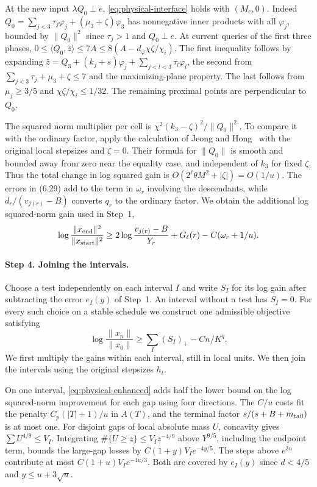 \documentclass[11pt]{article}
\theoremstyle{definition}
\begin{document}
At the new input $\lambda Q_0\perp e$, \eqref{eq:physical-interface} holds with $(M_c,0)$. Indeed $Q_0=\sum_{j<3}\tau_j\varphi_j+(\mu_3+\zeta)\varphi_3$ has nonnegative inner products with all $\varphi_j$, bounded by $\|Q_0\|^2$ since $\tau_j>1$ and $Q_0\perp e$. At current queries of the first three phases,
$0\le\langle Q_0,\widehat z\rangle\le7A\le8(A-d_\varphi\chi\zeta/\chi_i)$. The first inequality follows by expanding $\widehat z=Q_3+(k_j+s)\varphi_j+\sum_{j<l<3}\tau_l\varphi_l$, the second from $\sum_{j<3}\tau_j+\mu_3+\zeta\le7$ and the maximizing-plane property. The last follows from $\mu_j\ge3/5$ and $\chi\zeta/\chi_i\le1/32$. The remaining proximal points are perpendicular to $Q_0$.

The squared norm multiplier per cell is $\chi^2(k_3-\zeta)^2/\|Q_0\|^2$. To compare it with the ordinary factor, apply the calculation of Jeong and Hong~\cite[(6.20), (6.28)--(6.32)]{JH} with the original local stepsizes and $\zeta=0$. Their formula for $\|Q_0\|$ is smooth and bounded away from zero near the equality case, and independent of $k_3$ for fixed $\zeta$. Thus the total change in log squared gain is $O(2^\ell\theta M^2+|\zeta|)=O(1/u)$. The errors in (6.29) add to the term in $\omega_r$ involving the descendants, while $d_r/(v_{j(r)}-B)$ converts $q_r$ to the ordinary factor. We obtain the additional log squared-norm gain used in Step~1,
\begin{equation}\label{eq:physical-enhanced}
 \log\frac{\|x_{\rm end}\|^2}{\|x_{\rm start}\|^2}
 \ge 2\log\frac{v_{j(r)}-B}{Y_r}+G_\ell(r)-C(\omega_r+1/u).
\end{equation}

\paragraph{Step 4. Joining the intervals.}
Choose a test independently on each interval \(I\) and write \(S_I\)
for its log gain after subtracting the error \(e_I(y)\) of Step~1.
An interval without a test has \(S_I=0\). For every such choice on a
stable schedule we construct one admissible objective satisfying
\begin{equation}\label{eq:physical-simultaneous}
 \log\frac{\|x_n\|}{\|x_0\|}\ge\sum_I(S_I)_+-Cn/K^q .
\end{equation}
We first multiply the gains within each interval, still in local units.
We then join the intervals using the original stepsizes \(h_t\).

On one interval, \eqref{eq:physical-enhanced} adds half the lower bound on the log squared-norm improvement for each gap using four directions. The $C/u$ costs fit the penalty $C_p(|T|+1)/u$ in $A(T)$, and the terminal factor $s/(s+B+m_{\rm tail})$ is at most one. For disjoint gaps of local absolute mass $U$, concavity gives $\sum U^{4/9}\le V_I$. Integrating $\#\{U\ge z\}\le V_I z^{-4/9}$ above $Y^{9/5}$, including the endpoint term, bounds the large-gap losses by $C(1+y)V_Ie^{-4y/5}$. The steps above $e^{3u}$ contribute at most $C(1+u)V_Ie^{-4u/3}$. Both are covered by $e_I(y)$ since $d<4/5$ and $y\le u+3\sqrt u$.
\end{document}
